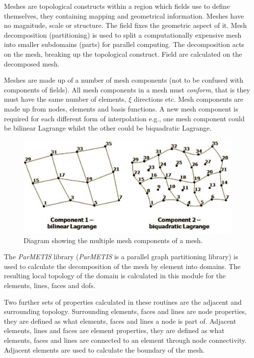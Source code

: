 Meshes are topological constructs within a region which fields use to define
themselves, they containing mapping and geometrical information. Meshes have 
no magnitude, scale or structure. The field fixes the geometric aspect of it. 
Mesh decomposition (partitioning) is used to split a computationally 
expensive mesh into smaller subdomains (parts) for parallel computing. The 
decomposition acts on the mesh, breaking up the topological construct. Field 
are calculated on the decomposed mesh. 

Meshes are made up of a number of mesh components (not to be confused with 
components of fields). All mesh components in a mesh must \emph{conform}, that 
is they must have the same number of elements, $\xi$ directions etc. Mesh 
components are made up from nodes, elements and basis functions. A new mesh 
component is required for each different form of interpolation e.g., one mesh 
component could be bilinear Lagrange whilst the other could be biquadratic 
Lagrange.

\begin{figure}
\centering
      \includegraphics[width=1\textwidth]{figs/Modules/mesh_components.eps}
\caption{Diagram showing the multiple mesh components of a mesh.}
\label{mesh_components}
\end{figure}

The \emph{ParMETIS} library (\emph{ParMETIS} is a parallel graph partitioning 
library) is used to calculate the decomposition of the mesh by element into 
domains. The resulting local topology of the domain is calculated in this 
module for the elements, lines, faces and dofs.

Two further sets of properties calculated in these routines are the adjacent 
and surrounding topology. Surrounding elements, faces and lines are node 
properties, they are defined as what elements, faces and lines a node is part 
of. Adjacent elements, lines and faces are element properties, they are defined 
as what elements, faces and lines are connected to an element through node 
connectivity. Adjacent elements are used to calculate the boundary of the mesh.


